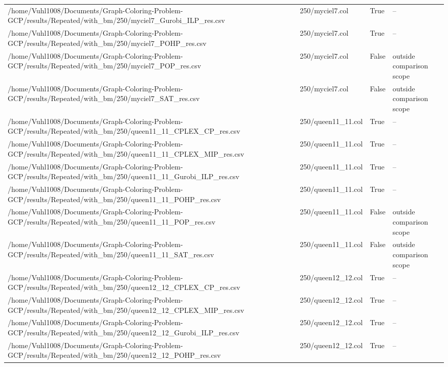 \begin{table}[htbp]
\begin{tabular}{llll}
/home/Vuhl1008/Documents/Graph-Coloring-Problem-GCP/results/Repeated/with\_bm/250/myciel7\_Gurobi\_ILP\_res.csv & 250/myciel7.col & True & -- \\
/home/Vuhl1008/Documents/Graph-Coloring-Problem-GCP/results/Repeated/with\_bm/250/myciel7\_POHP\_res.csv & 250/myciel7.col & True & -- \\
/home/Vuhl1008/Documents/Graph-Coloring-Problem-GCP/results/Repeated/with\_bm/250/myciel7\_POP\_res.csv & 250/myciel7.col & False & outside comparison scope \\
/home/Vuhl1008/Documents/Graph-Coloring-Problem-GCP/results/Repeated/with\_bm/250/myciel7\_SAT\_res.csv & 250/myciel7.col & False & outside comparison scope \\
/home/Vuhl1008/Documents/Graph-Coloring-Problem-GCP/results/Repeated/with\_bm/250/queen11\_11\_CPLEX\_CP\_res.csv & 250/queen11\_11.col & True & -- \\
/home/Vuhl1008/Documents/Graph-Coloring-Problem-GCP/results/Repeated/with\_bm/250/queen11\_11\_CPLEX\_MIP\_res.csv & 250/queen11\_11.col & True & -- \\
/home/Vuhl1008/Documents/Graph-Coloring-Problem-GCP/results/Repeated/with\_bm/250/queen11\_11\_Gurobi\_ILP\_res.csv & 250/queen11\_11.col & True & -- \\
/home/Vuhl1008/Documents/Graph-Coloring-Problem-GCP/results/Repeated/with\_bm/250/queen11\_11\_POHP\_res.csv & 250/queen11\_11.col & True & -- \\
/home/Vuhl1008/Documents/Graph-Coloring-Problem-GCP/results/Repeated/with\_bm/250/queen11\_11\_POP\_res.csv & 250/queen11\_11.col & False & outside comparison scope \\
/home/Vuhl1008/Documents/Graph-Coloring-Problem-GCP/results/Repeated/with\_bm/250/queen11\_11\_SAT\_res.csv & 250/queen11\_11.col & False & outside comparison scope \\
/home/Vuhl1008/Documents/Graph-Coloring-Problem-GCP/results/Repeated/with\_bm/250/queen12\_12\_CPLEX\_CP\_res.csv & 250/queen12\_12.col & True & -- \\
/home/Vuhl1008/Documents/Graph-Coloring-Problem-GCP/results/Repeated/with\_bm/250/queen12\_12\_CPLEX\_MIP\_res.csv & 250/queen12\_12.col & True & -- \\
/home/Vuhl1008/Documents/Graph-Coloring-Problem-GCP/results/Repeated/with\_bm/250/queen12\_12\_Gurobi\_ILP\_res.csv & 250/queen12\_12.col & True & -- \\
/home/Vuhl1008/Documents/Graph-Coloring-Problem-GCP/results/Repeated/with\_bm/250/queen12\_12\_POHP\_res.csv & 250/queen12\_12.col & True & -- \\

\end{tabular}
\end{table}
